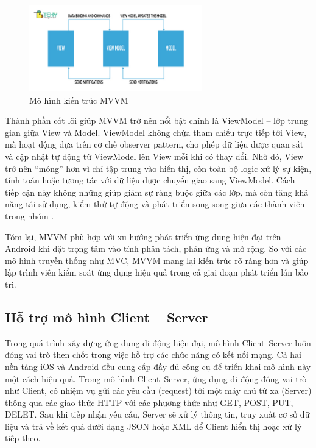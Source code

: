 \begin{figure}[H]
    \centering
    \includegraphics[width=0.67\textwidth]{images/mvvm.jpg}
    \caption{Mô hình kiến trúc MVVM \cite{tekyMVVM}}
    \label{fig:fig13}
  \end{figure}

    
      \hspace*{0.8cm}Thành phần cốt lõi giúp MVVM trở nên nổi bật chính là ViewModel – lớp trung gian giữa View và Model. ViewModel không chứa tham chiếu trực tiếp tới View, mà hoạt động dựa trên cơ chế observer pattern, cho phép dữ liệu được quan sát và cập nhật tự động từ ViewModel lên View mỗi khi có thay đổi. Nhờ đó, View trở nên “mỏng” hơn vì chỉ tập trung vào hiển thị, còn toàn bộ logic xử lý sự kiện, tính toán hoặc tương tác với dữ liệu được chuyển giao sang ViewModel. Cách tiếp cận này không những giúp giảm sự ràng buộc giữa các lớp, mà còn tăng khả năng tái sử dụng, kiểm thử tự động và phát triển song song giữa các thành viên trong nhóm \cite{testability_mvvm}.
    
      \vspace{0.5em}
    
        \hspace*{0.8cm}Tóm lại, MVVM phù hợp với xu hướng phát triển ứng dụng hiện đại trên Android khi đặt trọng tâm vào tính phân tách, phản ứng và mở rộng. So với các mô hình truyền thống như MVC, MVVM mang lại kiến trúc rõ ràng hơn và giúp lập trình viên kiểm soát ứng dụng hiệu quả trong cả giai đoạn phát triển lẫn bảo trì.
    

\subsection{Hỗ trợ mô hình Client – Server}
\renewcommand{\labelitemi}{--}    
    
        \hspace*{0.8cm}Trong quá trình xây dựng ứng dụng di động hiện đại, mô hình Client–Server luôn đóng vai trò then chốt trong việc hỗ trợ các chức năng có kết nối mạng. Cả hai nền tảng iOS và Android đều cung cấp đầy đủ công cụ để triển khai mô hình này một cách hiệu quả. Trong mô hình Client–Server, ứng dụng di động đóng vai trò như Client, có nhiệm vụ gửi các yêu cầu (request) tới một máy chủ từ xa (Server) thông qua các giao thức HTTP với các phương thức như GET, POST, PUT, DELET. Sau khi tiếp nhận yêu cầu, Server sẽ xử lý thông tin, truy xuất cơ sở dữ liệu và trả về kết quả dưới dạng JSON hoặc XML để Client hiển thị hoặc xử lý tiếp theo.
    


